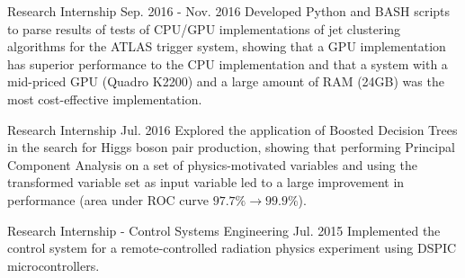 \begin{cventries}
    {Research Internship}
    {}
    {Sep. 2016 - Nov. 2016}
    {Developed Python and BASH scripts to parse results of tests of CPU/GPU implementations of jet clustering algorithms for the ATLAS trigger system, showing that a GPU implementation has superior performance to the CPU implementation and that a system with a mid-priced GPU (Quadro K2200) and a large amount of RAM (24GB) was the most cost-effective implementation.}

    {Research Internship}
    {}
    {Jul. 2016}
    {Explored the application of Boosted Decision Trees in the search for Higgs boson pair production, showing that performing Principal Component Analysis on a set of physics-motivated variables and using the transformed variable set as input variable led to a large improvement in performance (area under ROC curve $97.7\% \to 99.9\%$).}

    {Research Internship - Control Systems Engineering}
    {}
    {Jul. 2015}
    {Implemented the control system for a remote-controlled radiation physics experiment using DSPIC microcontrollers.}

\end{cventries}